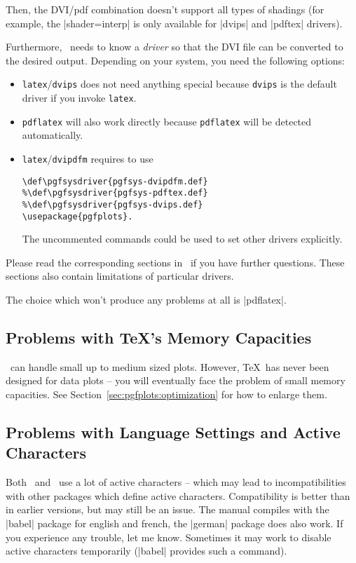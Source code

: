 Then, the DVI/pdf combination doesn't support all types of shadings (for example, the |shader=interp| is only available for |dvips| and |pdftex| drivers).

Furthermore, \PGF\ needs to know a \emph{driver} so that the DVI file can be converted to the desired output. Depending on your system, you need the following options:
\begin{itemize}
	\item \lstinline!latex!/\lstinline!dvips! does not need anything special because \lstinline!dvips! is the default driver if you invoke \lstinline!latex!.
	\item \lstinline!pdflatex! will also work directly because \lstinline!pdflatex! will be detected automatically.
	\item \lstinline!latex!/\lstinline!dvipdfm! requires to use
\begin{verbatim}
\def\pgfsysdriver{pgfsys-dvipdfm.def}
%\def\pgfsysdriver{pgfsys-pdftex.def}
%\def\pgfsysdriver{pgfsys-dvips.def}
\usepackage{pgfplots}.
\end{verbatim}
	The uncommented commands could be used to set other drivers explicitly.
\end{itemize}
Please read the corresponding sections in~\cite[Section 7.2.1 and 7.2.2]{tikz} if you have further questions. These sections also contain limitations of particular drivers.

The choice which won't produce any problems at all is |pdflatex|.

\subsection{Problems with \TeX's Memory Capacities}
\PGFPlots\ can handle small up to medium sized plots. However, \TeX\ has never been designed for data plots -- you will eventually face the problem of small memory capacities. See Section~\ref{sec:pgfplots:optimization} for how to enlarge them.

\subsection{Problems with Language Settings and Active Characters}
Both \PGF\ and \PGFPlots\ use a lot of active characters -- which may lead to incompatibilities with other packages which define active characters. Compatibility is better than in earlier versions, but may still be an issue. The manual compiles with the |babel| package for english and french, the |german| package does also work. If you experience any trouble, let me know. Sometimes it may work to disable active characters temporarily (|babel| provides such a command).

